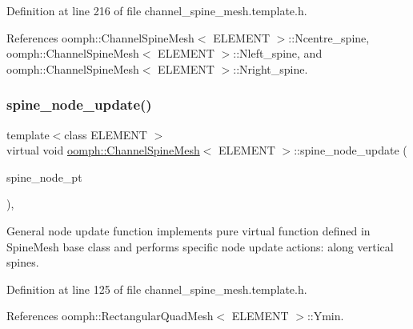 Definition at line 216 of file channel\+\_\+spine\+\_\+mesh.\+template.\+h.



References oomph\+::\+Channel\+Spine\+Mesh$<$ E\+L\+E\+M\+E\+N\+T $>$\+::\+Ncentre\+\_\+spine, oomph\+::\+Channel\+Spine\+Mesh$<$ E\+L\+E\+M\+E\+N\+T $>$\+::\+Nleft\+\_\+spine, and oomph\+::\+Channel\+Spine\+Mesh$<$ E\+L\+E\+M\+E\+N\+T $>$\+::\+Nright\+\_\+spine.

\mbox{\label{classoomph_1_1ChannelSpineMesh_aefa38017e44e64ad0cd86d87d397bf8d}} 
\subsubsection{\texorpdfstring{spine\+\_\+node\+\_\+update()}{spine\_node\_update()}}
{\footnotesize\ttfamily template$<$class E\+L\+E\+M\+E\+NT $>$ \\
virtual void \hyperlink{classoomph_1_1ChannelSpineMesh}{oomph\+::\+Channel\+Spine\+Mesh}$<$ E\+L\+E\+M\+E\+NT $>$\+::spine\+\_\+node\+\_\+update (\begin{DoxyParamCaption}\item[{Spine\+Node $\ast$}]{spine\+\_\+node\+\_\+pt }\end{DoxyParamCaption})\hspace{0.3cm}{\ttfamily [inline]}, {\ttfamily [virtual]}}



General node update function implements pure virtual function defined in Spine\+Mesh base class and performs specific node update actions\+: along vertical spines. 



Definition at line 125 of file channel\+\_\+spine\+\_\+mesh.\+template.\+h.



References oomph\+::\+Rectangular\+Quad\+Mesh$<$ E\+L\+E\+M\+E\+N\+T $>$\+::\+Ymin.

\mbox{\label{classoomph_1_1ChannelSpineMesh_a54818e02db7026d39451f5f502e1cf11}} 
